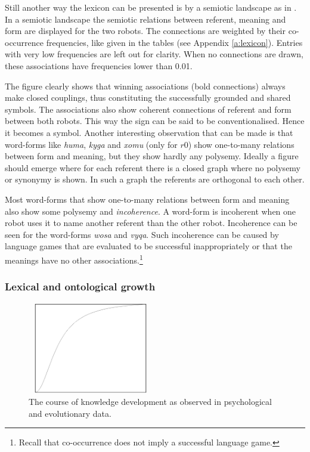 Still another way the lexicon can be presented is by a semiotic landscape as in . In a semiotic landscape the semiotic relations between referent, meaning and form are displayed for the two robots. The connections are weighted by their co-occurrence frequencies, like given in the tables (see Appendix \ref{a:lexicon}). Entries with very low frequencies are left out for clarity. When no connections are drawn, these associations have frequencies lower than 0.01.

The figure clearly shows that winning associations (bold connections) always make closed couplings, thus constituting the successfully grounded and shared symbols. The associations also show coherent connections of referent and form between both robots. This way the sign can be said to be conventionalised. Hence it becomes a symbol. Another interesting observation that can be made is that word-forms like {\it huma}, {\it kyga} and {\it xomu} (only for $r0$) show one-to-many relations between form and meaning, but they show hardly any polysemy. Ideally a figure should emerge where for each referent there is a closed graph where no polysemy or synonymy is shown. In such a graph the referents are orthogonal to each other.

Most word-forms that show one-to-many relations between form and meaning also show some polysemy and {\em incoherence}. A word-form is incoherent when one robot uses it to name another referent than the other robot. Incoherence can be seen for the word-forms {\it wosa} and {\it vyqa}. Such incoherence can be caused by language games that are evaluated to be successful inappropriately or that the meanings have no other associations.\footnote{Recall that co-occurrence does not imply a successful language game.}

\subsubsection{Lexical and ontological growth}

\begin{figure}
\centerline{\includegraphics[width=5.5cm,height=4cm]{basic/growth.eps}}
\caption{The course of knowledge development as observed in psychological and evolutionary data.}
\label{f:st:growth}
\end{figure}

